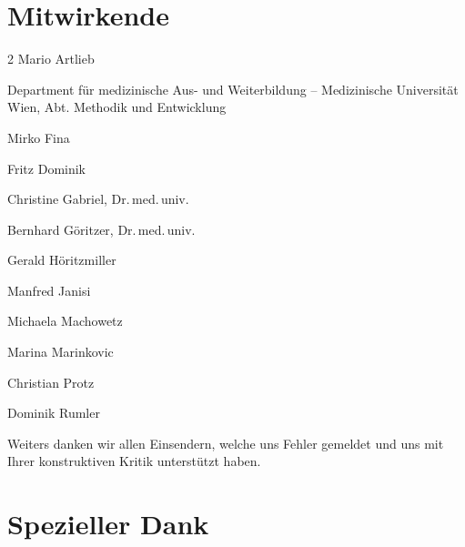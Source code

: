 \documentclass[
ngerman,
paper=a4,
asymmetric,
fontsize=9pt,
headings=small,
draft=false,
parskip=false,
footnotes=multiple,
]{scrbook}
\begin{document}
\section*{Mitwirkende}

\begin{multicols}{2}
Mario Artlieb

Department für medizinische Aus- und Weiterbildung -- Medizinische Universität
Wien, Abt. Methodik und Entwicklung

Mirko Fina

Fritz Dominik

Christine Gabriel, Dr.\,med.\,univ.

Bernhard Göritzer, Dr.\,med.\,univ.

Gerald Höritzmiller

Manfred Janisi

Michaela Machowetz

Marina Marinkovic

Christian Protz

Dominik Rumler


Weiters danken wir allen Einsendern, welche uns Fehler gemeldet und uns mit
Ihrer konstruktiven Kritik unterstützt haben.

\end{multicols}

\restoregeometry
\section*{Spezieller Dank}
\end{document}
